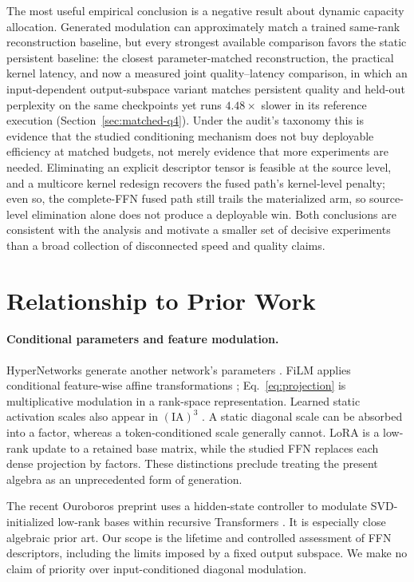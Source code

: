 The most useful empirical conclusion is a negative result about dynamic
capacity allocation. Generated modulation can approximately match a trained
same-rank reconstruction baseline, but every strongest available comparison
favors the static persistent baseline: the closest parameter-matched
reconstruction, the practical kernel latency, and now a measured joint
quality--latency comparison, in which an input-dependent output-subspace
variant matches persistent quality and held-out perplexity on the same
checkpoints yet runs $4.48\times$ slower in its reference execution
(Section~\ref{sec:matched-q4}). Under the audit's
taxonomy this is evidence that the studied conditioning mechanism does not
buy deployable efficiency at matched budgets, not merely evidence that more
experiments are needed. Eliminating an explicit descriptor tensor is feasible
at the source level, and a multicore kernel redesign recovers the fused
path's kernel-level penalty; even so, the complete-FFN fused path still
trails the materialized arm, so source-level elimination alone does not
produce a deployable win. Both conclusions
are consistent with the analysis and motivate a smaller set of decisive
experiments than a broad collection of disconnected speed and quality claims.

\section{Relationship to Prior Work}
\paragraph{Conditional parameters and feature modulation.}
HyperNetworks generate another network's parameters \citep{ha2017hypernetworks}.
FiLM applies conditional feature-wise affine transformations
\citep{perez2018film}; Eq.~\eqref{eq:projection} is multiplicative modulation in
a rank-space representation. Learned static activation scales also appear in
$(\mathrm{IA})^3$ \citep{liu2022ia3}. A static diagonal scale can be absorbed
into a factor, whereas a token-conditioned scale generally cannot. LoRA
\citep{hu2022lora} is a low-rank update to a retained base matrix, while the
studied FFN replaces each dense projection by factors. These distinctions
preclude treating the present algebra as an unprecedented form of generation.

The recent Ouroboros preprint uses a hidden-state controller to modulate
SVD-initialized low-rank bases within recursive Transformers
\citep{jaber2026ouroboros}. It is especially close algebraic prior art.
Our scope is the lifetime and controlled assessment of FFN descriptors,
including the limits imposed by a fixed output subspace. We make no claim of
priority over input-conditioned diagonal modulation.

